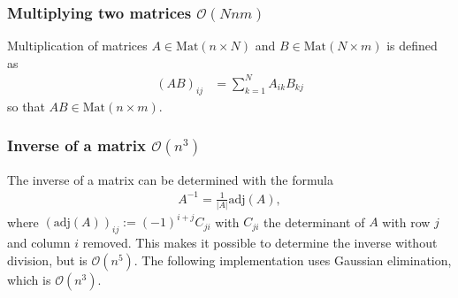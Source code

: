 \subsubsection{Multiplying two matrices $\mathcal O(Nnm)$}
Multiplication of matrices $A \in \text{Mat}(n \times N)$ and $B \in \text{Mat}(N \times m)$ is defined as
\begin{align*}
    (AB)_{ij} &= \sum_{k=1}^N A_{ik} B_{kj}
\end{align*}
so that $AB \in \text{Mat}(n \times m)$.

\subsubsection{Inverse of a matrix $\mathcal O(n^3)$}
The inverse of a matrix can be determined with the formula
\begin{align*}
    A^{-1} = \frac1{|A|}\text{adj}(A),
\end{align*}
where $(\text{adj}(A))_{ij} := (-1)^{i + j}C_{ji}$ with $C_{ji}$ the determinant of $A$ with row $j$ and column $i$ removed. This makes it possible to determine the inverse without division, but is $\mathcal O(n^5)$. The following implementation uses Gaussian elimination, which is $\mathcal O(n^3)$.

